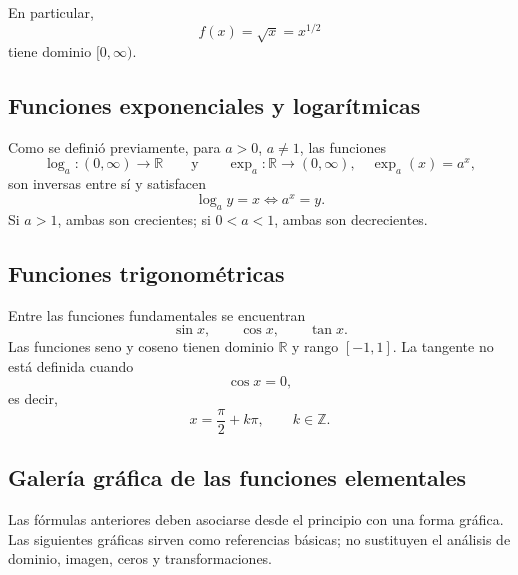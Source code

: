 \documentclass[12pt]{article}
\theoremstyle{remark}
\newcommand{\R}{\mathbb{R}}
\begin{document}
En particular,
\[
f(x)=\sqrt{x}=x^{1/2}
\]
tiene dominio $[0,\infty)$.

\subsection{Funciones exponenciales y logarítmicas}

Como se definió previamente, para $a>0$, $a\neq1$, las funciones
\[
\log_a:(0,\infty)\to\R
\qquad\text{y}\qquad
\exp_a:\R\to(0,\infty),\quad \exp_a(x)=a^x,
\]
son inversas entre sí y satisfacen
\[
\boxed{\log_a y=x\Longleftrightarrow a^x=y}.
\]
Si $a>1$, ambas son crecientes; si $0<a<1$, ambas son decrecientes.

\subsection{Funciones trigonométricas}

Entre las funciones fundamentales se encuentran
\[
\sin x,\qquad\cos x,\qquad\tan x.
\]
Las funciones seno y coseno tienen dominio $\R$ y rango $[-1,1]$. La tangente
no está definida cuando
\[
\cos x=0,
\]
es decir,
\[
x=\frac{\pi}{2}+k\pi,\qquad k\in\mathbb Z.
\]


\subsection{Galería gráfica de las funciones elementales}

Las fórmulas anteriores deben asociarse desde el principio con una forma
gráfica. Las siguientes gráficas sirven como referencias básicas; no sustituyen
el análisis de dominio, imagen, ceros y transformaciones.

\begin{center}
\end{center}

\begin{center}
\end{center}
\end{document}
